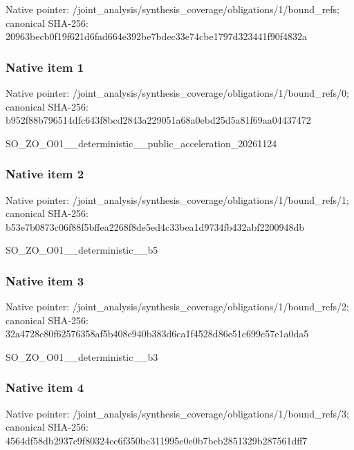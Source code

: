 \documentclass[10pt,a4paper]{article}
\begin{document}
Native pointer: /joint\_analysis/synthesi\allowbreak{}s\_coverage/obligations/1\allowbreak{}/bound\_refs; canonical SHA-256: 20963becb0f19f621d6fad66\allowbreak{}4e392be7bdec33e74cbe1797\allowbreak{}d323441f90f4832a



\subsubsection{Native item 1}


Native pointer: /joint\_analysis/synthesi\allowbreak{}s\_coverage/obligations/1\allowbreak{}/bound\_refs/0; canonical SHA-256: b952f88b796514dfc643f8bc\allowbreak{}d2843a229051a68a0ebd25d5\allowbreak{}a81f69aa04437472


SO\_ZO\_O01\_\_deterministic\allowbreak{}\_\_public\_acceleration\_20\allowbreak{}261124


\subsubsection{Native item 2}


Native pointer: /joint\_analysis/synthesi\allowbreak{}s\_coverage/obligations/1\allowbreak{}/bound\_refs/1; canonical SHA-256: b53e7b0873c06f88f5bffea2\allowbreak{}268f8de5ed4c33bea1d9734f\allowbreak{}b432abf2200948db


SO\_ZO\_O01\_\_deterministic\_\_b5


\subsubsection{Native item 3}


Native pointer: /joint\_analysis/synthesi\allowbreak{}s\_coverage/obligations/1\allowbreak{}/bound\_refs/2; canonical SHA-256: 32a4728c80f62576358af5b4\allowbreak{}08e940b383d6ca1f4528d86e\allowbreak{}51c699c57e1a0da5


SO\_ZO\_O01\_\_deterministic\_\_b3


\subsubsection{Native item 4}


Native pointer: /joint\_analysis/synthesi\allowbreak{}s\_coverage/obligations/1\allowbreak{}/bound\_refs/3; canonical SHA-256: 4564df58db2937c9f80324ec\allowbreak{}6f350bc311995c0e0b7bcb28\allowbreak{}51329b287561dff7
\end{document}
